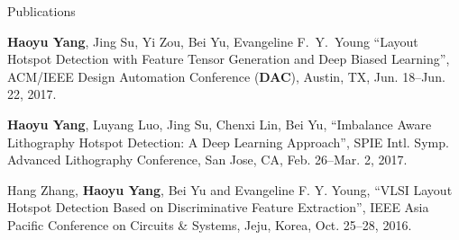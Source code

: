 \begin{rSection}{Publications}
\begin{description}[font=\normalfont]
{	}
	\item[{[C3]}]{
		\textbf{Haoyu Yang}, Jing Su, Yi Zou, Bei Yu, Evangeline F.~Y.~Young
		``Layout Hotspot Detection with Feature Tensor Generation and Deep Biased Learning'',
		ACM/IEEE Design Automation Conference (\textbf{DAC}), Austin, TX, Jun. 18--Jun. 22, 2017. 
	}
	\item[{[C2]}]{
		\textbf{Haoyu Yang}, Luyang Luo, Jing Su, Chenxi Lin, Bei Yu,
		``Imbalance Aware Lithography Hotspot Detection: A Deep Learning Approach'',
		SPIE Intl. Symp. Advanced Lithography Conference, San Jose, CA, Feb. 26--Mar. 2, 2017. 
	}
	\item[{[C1]}]{
		Hang Zhang, \textbf{Haoyu Yang}, Bei Yu and Evangeline F. Y. Young,
		``VLSI Layout Hotspot Detection Based on Discriminative Feature Extraction'',
		IEEE Asia Pacific Conference on Circuits \& Systems, Jeju, Korea, Oct. 25--28, 2016.
	}
\end{description}



\fi




\end{rSection}


